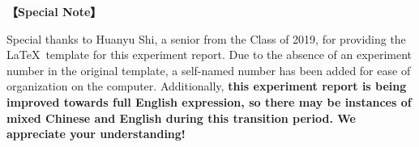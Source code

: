 	
	
\textbf{【Special Note】}	

Special thanks to Huanyu Shi, a senior from the Class of 2019, for providing the \LaTeX \ template for this experiment report. \textcolor{fred}{Due to the absence of an experiment number in the original template, a self-named number has been added for ease of organization on the computer.} Additionally, \textbf{this experiment report is being improved towards full English expression, so there may be instances of mixed Chinese and English during this transition period. We appreciate your understanding!}
	

\clearpage
\tableofcontents		